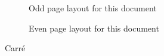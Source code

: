 \documentclass[Carre]{lulubook}
\begin{document}
\begin{figure}
\currentpage
\oddpagelayouttrue
\pagedesign
\caption{Odd page layout for this document} \label{fig:ptrs}
\end{figure}


\begin{figure}
\currentpage
\oddpagelayoutfalse
\pagedesign
\caption{Even page layout for this document} \label{fig:ptrs}
\end{figure}

Carré
\end{document}
